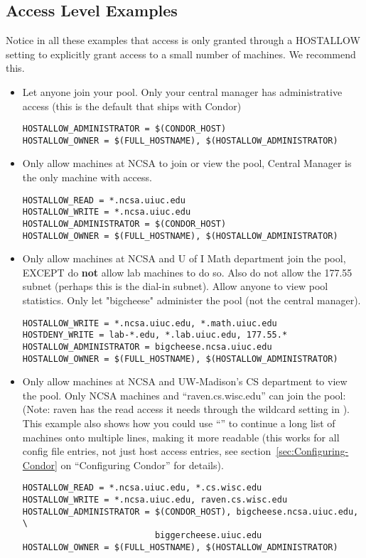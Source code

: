 \subsection{\label{sec:DCPerm-Examples}Access Level Examples}

Notice in all these examples that  access is
only granted through a HOSTALLOW setting to explicitly grant access to
a small number of machines.  We recommend this.

\begin{itemize}

\item Let anyone join your pool.  Only your central manager has
administrative access (this is the default that ships with Condor)
\begin{verbatim}
HOSTALLOW_ADMINISTRATOR = $(CONDOR_HOST)
HOSTALLOW_OWNER = $(FULL_HOSTNAME), $(HOSTALLOW_ADMINISTRATOR)
\end{verbatim}

\item Only allow machines at NCSA to join or view the pool, Central
Manager is the only machine with  access.
\begin{verbatim}
HOSTALLOW_READ = *.ncsa.uiuc.edu
HOSTALLOW_WRITE = *.ncsa.uiuc.edu
HOSTALLOW_ADMINISTRATOR = $(CONDOR_HOST)
HOSTALLOW_OWNER = $(FULL_HOSTNAME), $(HOSTALLOW_ADMINISTRATOR)
\end{verbatim}

\item Only allow machines at NCSA and U of I Math department join the
pool, EXCEPT do \textbf{not} allow lab machines to do so.  Also do not
allow the 177.55 subnet (perhaps this is the dial-in subnet).  Allow
anyone to view pool statistics.  Only let "bigcheese" administer the
pool (not the central manager).
\begin{verbatim}
HOSTALLOW_WRITE = *.ncsa.uiuc.edu, *.math.uiuc.edu
HOSTDENY_WRITE = lab-*.edu, *.lab.uiuc.edu, 177.55.*
HOSTALLOW_ADMINISTRATOR = bigcheese.ncsa.uiuc.edu
HOSTALLOW_OWNER = $(FULL_HOSTNAME), $(HOSTALLOW_ADMINISTRATOR)
\end{verbatim}

\item Only allow machines at NCSA and UW-Madison's CS department to
view the pool.  Only NCSA machines and ``raven.cs.wisc.edu'' can join
the pool: (Note: raven has the read access it needs through the
wildcard setting in ).  This example also shows
how you could use ``\verb@\@'' to continue a long list of machines
onto multiple lines, making it more readable (this works for all
config file entries, not just host access entries, see
section~\ref{sec:Configuring-Condor} on ``Configuring Condor'' for
details).
\begin{verbatim}
HOSTALLOW_READ = *.ncsa.uiuc.edu, *.cs.wisc.edu
HOSTALLOW_WRITE = *.ncsa.uiuc.edu, raven.cs.wisc.edu
HOSTALLOW_ADMINISTRATOR = $(CONDOR_HOST), bigcheese.ncsa.uiuc.edu, \
                          biggercheese.uiuc.edu
HOSTALLOW_OWNER = $(FULL_HOSTNAME), $(HOSTALLOW_ADMINISTRATOR)
\end{verbatim}


\end{itemize}
